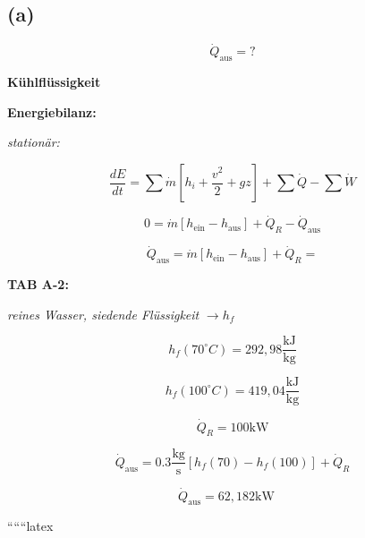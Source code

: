

\subsection*{(a)}

\[
\dot{Q}_{\text{aus}} = ?
\]

\textbf{Kühlflüssigkeit}

\textbf{Energiebilanz:}

\textit{stationär:}

\[
\frac{dE}{dt} = \sum \dot{m} \left[ h_i + \frac{v^2}{2} + gz \right] + \sum \dot{Q} - \sum \dot{W}
\]

\[
0 = \dot{m} \left[ h_{\text{ein}} - h_{\text{aus}} \right] + \dot{Q}_R - \dot{Q}_{\text{aus}}
\]

\[
\dot{Q}_{\text{aus}} = \dot{m} \left[ h_{\text{ein}} - h_{\text{aus}} \right] + \dot{Q}_R =
\]

\textbf{TAB A-2:}

\textit{reines Wasser, siedende Flüssigkeit} $\rightarrow h_f$

\[
h_f (70^\circ C) = 292,98 \frac{\text{kJ}}{\text{kg}}
\]

\[
h_f (100^\circ C) = 419,04 \frac{\text{kJ}}{\text{kg}}
\]

\[
\dot{Q}_R = 100 \text{kW}
\]

\[
\dot{Q}_{\text{aus}} = 0.3 \frac{\text{kg}}{\text{s}} \left[ h_f (70) - h_f (100) \right] + \dot{Q}_R
\]

\[
\dot{Q}_{\text{aus}} = 62,182 \text{kW} \quad \boxed{}
\]

``````latex
